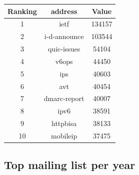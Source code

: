 \documentclass[a4paper,english]{report}
\begin{document}
\begin{center}
 \begin{tabular}{|c | c | c|}
 \hline
Ranking & address & Value \\ [0.5ex]
 \hline\hline
1 & ietf & 134157\\
\hline
2 & i-d-announce & 103544\\
\hline
3 & quic-issues & 54104\\
\hline
4 & v6ops & 44450\\
\hline
5 & ips & 40603\\
\hline
6 & avt & 40454\\
\hline
7 & dmarc-report & 40007\\
\hline
8 & ipv6 & 38591\\
\hline
9 & httpbisa & 38133\\
\hline
10 & mobileip & 37475\\
\hline
\end{tabular}


\end{center}



\subsection{Top mailing list per year}
\end{document}
